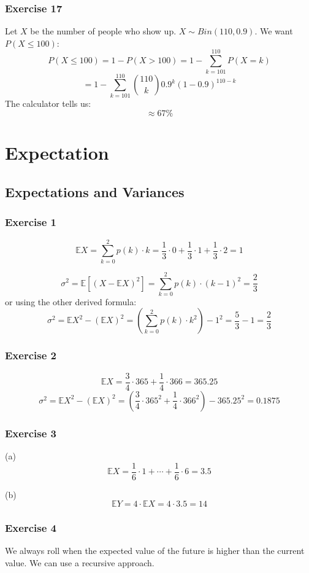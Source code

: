 \documentclass{book}
\begin{document}
\subsection*{Exercise 17}
Let $X$ be the number of people who show up. $X \sim Bin(110, 0.9)$. We want $P(X \leq 100)$:
$$P(X \leq 100) = 1 - P(X > 100) = 1 - \sum_{k = 101}^{110} P(X = k)$$
$$= 1 - \sum_{k = 101}^{110} \binom{110}{k} 0.9^k (1 - 0.9)^{110 - k}$$
The calculator tells us:
$$\approx 67\%$$

\chapter{Expectation}

\section{Expectations and Variances}

\subsection*{Exercise 1}
$$\mathbb{E} X = \sum_{k = 0}^2 p(k) \cdot k = \frac{1}{3} \cdot 0 + \frac{1}{3} \cdot 1 + \frac{1}{3} \cdot 2 = 1$$

$$\sigma^2 = \mathbb{E} [(X - \mathbb{E}X)^2] = \sum_{k = 0}^2 p(k) \cdot (k - 1)^2 = \frac{2}{3}$$
or using the other derived formula:
$$\sigma^2 = \mathbb{E} X^2 - (\mathbb{E}X)^2 = \left(\sum_{k = 0}^2 p(k) \cdot k^2 \right) - 1^2 = \frac{5}{3} - 1 = \frac{2}{3}$$

\subsection*{Exercise 2}
$$\mathbb{E} X = \frac{3}{4} \cdot 365 + \frac{1}{4} \cdot 366 = 365.25$$
$$\sigma^2 = \mathbb{E} X^2 - (\mathbb{E} X)^2 = \left(\frac{3}{4} \cdot 365^2 + \frac{1}{4} \cdot 366^2\right) - 365.25^2 = 0.1875$$

\subsection*{Exercise 3}
(a)
$$\mathbb{E} X = \frac{1}{6} \cdot 1 + \cdots + \frac{1}{6} \cdot 6 = 3.5$$

\noindent
(b)
$$\mathbb{E} Y = 4 \cdot \mathbb{E} X = 4 \cdot 3.5 = 14$$

\subsection*{Exercise 4}
We always roll when the expected value of the future is higher than the current value. We can use a recursive approach.
\end{document}
